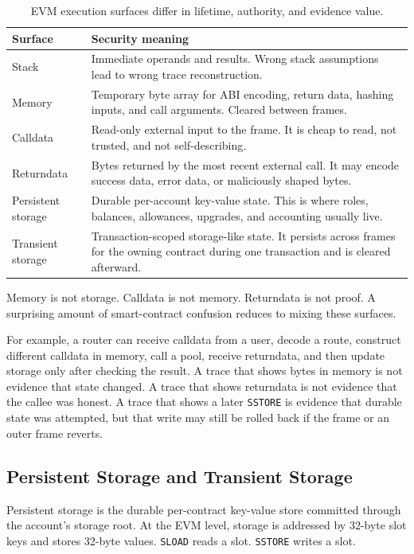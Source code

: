 \begin{table}[htbp]
\centering
\small
\renewcommand{\arraystretch}{1.18}
\begin{tabularx}{\textwidth}{@{}>{\RaggedRight\arraybackslash}p{}X@{}}
\toprule
Surface & Security meaning \\
\midrule
Stack & Immediate operands and results. Wrong stack assumptions lead to wrong trace reconstruction. \\
Memory & Temporary byte array for ABI encoding, return data, hashing inputs, and call arguments. Cleared between frames. \\
Calldata & Read-only external input to the frame. It is cheap to read, not trusted, and not self-describing. \\
Returndata & Bytes returned by the most recent external call. It may encode success data, error data, or maliciously shaped bytes. \\
Persistent storage & Durable per-account key-value state. This is where roles, balances, allowances, upgrades, and accounting usually live. \\
Transient storage & Transaction-scoped storage-like state. It persists across frames for the owning contract during one transaction and is cleared afterward. \\
\bottomrule
\end{tabularx}
\caption{EVM execution surfaces differ in lifetime, authority, and evidence value.}
\end{table}

Memory is not storage. Calldata is not memory. Returndata is not proof. A surprising amount of smart-contract confusion reduces to mixing these surfaces.

For example, a router can receive calldata from a user, decode a route, construct different calldata in memory, call a pool, receive returndata, and then update storage only after checking the result. A trace that shows bytes in memory is not evidence that state changed. A trace that shows returndata is not evidence that the callee was honest. A trace that shows a later \texttt{SSTORE} is evidence that durable state was attempted, but that write may still be rolled back if the frame or an outer frame reverts.

\subsection{Persistent Storage and Transient Storage}

Persistent storage is the durable per-contract key-value store committed through the account's storage root. At the EVM level, storage is addressed by 32-byte slot keys and stores 32-byte values. \texttt{SLOAD} reads a slot. \texttt{SSTORE} writes a slot.


